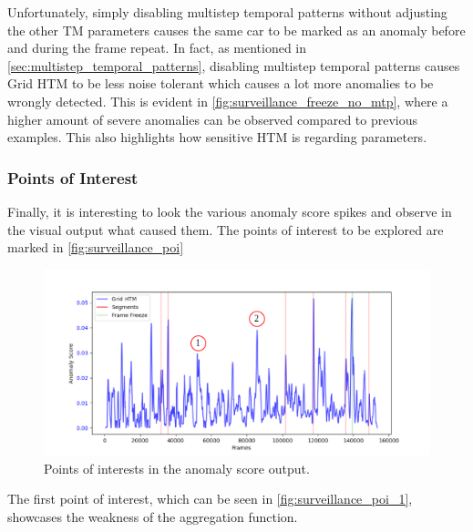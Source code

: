 Unfortunately, simply disabling multistep temporal patterns without adjusting the other TM parameters causes the same car to be marked as an anomaly before and during the frame repeat. In fact, as mentioned in \autoref{sec:multistep_temporal_patterns}, disabling multistep temporal patterns causes Grid HTM to be less noise tolerant which causes a lot more anomalies to be wrongly detected. This is evident in \autoref{fig:surveillance_freeze_no_mtp}, where a higher amount of severe anomalies can be observed compared to previous examples. This also highlights how sensitive HTM is regarding parameters.
\subsubsection{Points of Interest}
Finally, it is interesting to look the various anomaly score spikes and observe in the visual output what caused them. The points of interest to be explored are marked in \autoref{fig:surveillance_poi}
\begin{figure}[H]
    \centering
    \includegraphics[width=\textwidth]{resources/experiments/surveillance/surveillance_result_poi.png}
    \caption{Points of interests in the anomaly score output.}
    \label{fig:surveillance_poi}
\end{figure}
The first point of interest, which can be seen in \autoref{fig:surveillance_poi_1}, showcases the weakness of the aggregation function.
